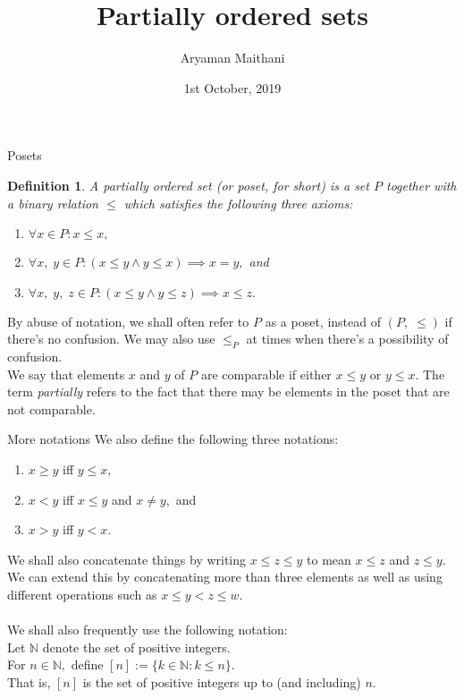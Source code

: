 \documentclass[handout, aspectratio=169]{beamer}
\title{Partially ordered sets}
\author{Aryaman Maithani}
\date[01-10-2019]{1st October, 2019}
\institute[IITB]{Undergraduate\\ IIT Bombay}
\newtheorem{defn}{Definition}
\begin{document}
\begin{frame}
	\titlepage
\end{frame}
\begin{frame}{Posets}
	\begin{defn}
		A partially ordered set (or poset, for short) is a set $P$ together with a binary relation $\le$ which satisfies the following three axioms:
		\begin{enumerate}
			\item $\forall x \in P: x \le x,$
			\item $\forall x, \; y \in P: (x \le y \wedge y \le x) \implies x = y,$ and
			\item $\forall x,\;y,\;z \in P: (x \le y \wedge y \le z) \implies x \le z.$
		\end{enumerate}
	\end{defn}
	By abuse of notation, we shall often refer to $P$ as a poset, instead of $(P, \;\le)$ if there's no confusion. We may also use $\le_P$ at times when there's a possibility of confusion.\\
	We say that elements $x$ and $y$ of $P$ are comparable if either $x \le y$ or $y \le x.$ The term \emph{partially} refers to the fact that there may be elements in the poset that are not comparable.
\end{frame}
\begin{frame}{More notations}
	We also define the following three notations:
	\begin{enumerate} 
		\item $x \ge y$ iff $y \le x,$
		\item $x < y$ iff $x \le y$ and $x \neq y,$ and
		\item $x > y$ iff $y < x.$
	\end{enumerate}
	We shall also concatenate things by writing $x \le z \le y$ to mean $x \le z$ and $z \le y.$ We can extend this by concatenating more than three elements as well as using different operations such as $x \le y < z \le w.$\\~\\
	We shall also frequently use the following notation:\\
	Let $\mathbb{N}$ denote the set of positive integers.\\
	For $n \in \mathbb{N},$ define $[n] := \{k \in \mathbb{N} : k \le n\}.$\\
	That is, $[n]$ is the set of positive integers up to (and including) $n.$
\end{frame}
\end{document}
